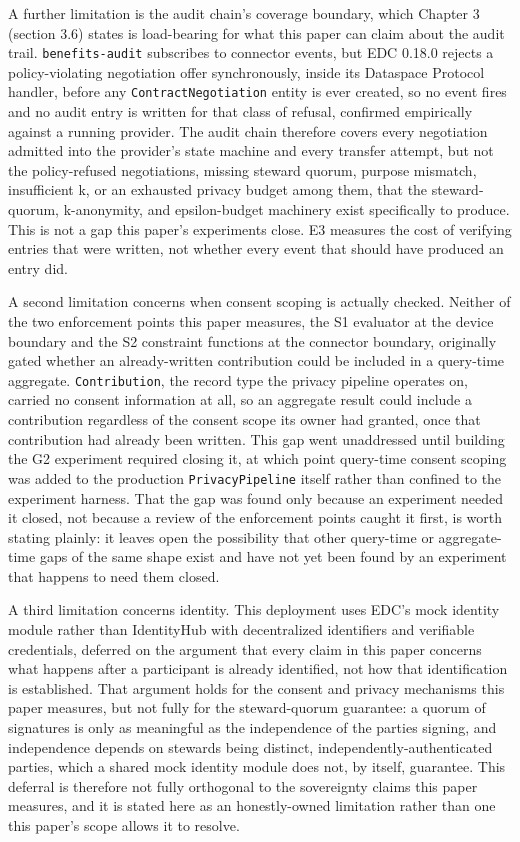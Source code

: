 A further limitation is the audit chain's coverage boundary, which Chapter 3 (section 3.6) states is load-bearing for what this paper can claim about the audit trail. \texttt{benefits-audit} subscribes to connector events, but EDC 0.18.0 rejects a policy-violating negotiation offer synchronously, inside its Dataspace Protocol handler, before any \texttt{ContractNegotiation} entity is ever created, so no event fires and no audit entry is written for that class of refusal, confirmed empirically against a running provider. The audit chain therefore covers every negotiation admitted into the provider's state machine and every transfer attempt, but not the policy-refused negotiations, missing steward quorum, purpose mismatch, insufficient k, or an exhausted privacy budget among them, that the steward-quorum, k-anonymity, and epsilon-budget machinery exist specifically to produce. This is not a gap this paper's experiments close. E3 measures the cost of verifying entries that were written, not whether every event that should have produced an entry did.

A second limitation concerns when consent scoping is actually checked. Neither of the two enforcement points this paper measures, the S1 evaluator at the device boundary and the S2 constraint functions at the connector boundary, originally gated whether an already-written contribution could be included in a query-time aggregate. \texttt{Contribution}, the record type the privacy pipeline operates on, carried no consent information at all, so an aggregate result could include a contribution regardless of the consent scope its owner had granted, once that contribution had already been written. This gap went unaddressed until building the G2 experiment required closing it, at which point query-time consent scoping was added to the production \texttt{PrivacyPipeline} itself rather than confined to the experiment harness. That the gap was found only because an experiment needed it closed, not because a review of the enforcement points caught it first, is worth stating plainly: it leaves open the possibility that other query-time or aggregate-time gaps of the same shape exist and have not yet been found by an experiment that happens to need them closed.

A third limitation concerns identity. This deployment uses EDC's mock identity module rather than IdentityHub with decentralized identifiers and verifiable credentials, deferred on the argument that every claim in this paper concerns what happens after a participant is already identified, not how that identification is established. That argument holds for the consent and privacy mechanisms this paper measures, but not fully for the steward-quorum guarantee: a quorum of signatures is only as meaningful as the independence of the parties signing, and independence depends on stewards being distinct, independently-authenticated parties, which a shared mock identity module does not, by itself, guarantee. This deferral is therefore not fully orthogonal to the sovereignty claims this paper measures, and it is stated here as an honestly-owned limitation rather than one this paper's scope allows it to resolve.


